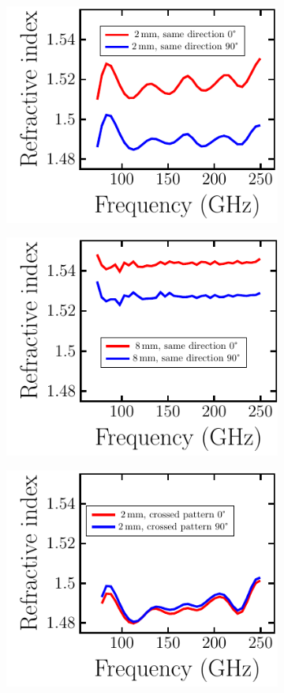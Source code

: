 \begin{figure}[H]
    \begin{subfigure}[b]{.33\linewidth}
    \caption{}\label{}
    \centering\includegraphics[scale=0.6]{images/results/plots/polymer/IntrinsicBF/ri_fullplates_b.pdf}
    \end{subfigure}%
    \begin{subfigure}[b]{.33\linewidth}
    \caption{}\label{}
    \centering\includegraphics[scale=0.6]{images/results/plots/polymer/IntrinsicBF/ri_fullplates_c.pdf}
    \end{subfigure}
    \begin{subfigure}[b]{.33\linewidth}
    \caption{}\label{}
    \centering\includegraphics[scale=0.6]{images/results/plots/polymer/IntrinsicBF/ri_fullplates_a.pdf}

\end{subfigure}
\end{figure}
